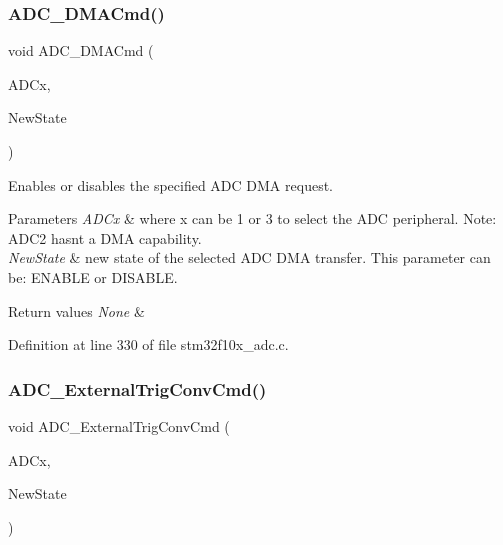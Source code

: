 \subsubsection{\texorpdfstring{A\+D\+C\+\_\+\+D\+M\+A\+Cmd()}{ADC\_DMACmd()}}
{\footnotesize\ttfamily void A\+D\+C\+\_\+\+D\+M\+A\+Cmd (\begin{DoxyParamCaption}\item[{\hyperlink{struct_a_d_c___type_def}{A\+D\+C\+\_\+\+Type\+Def} $\ast$}]{A\+D\+Cx,  }\item[{\hyperlink{group___exported__types_gac9a7e9a35d2513ec15c3b537aaa4fba1}{Functional\+State}}]{New\+State }\end{DoxyParamCaption})}



Enables or disables the specified A\+DC D\+MA request. 


\begin{DoxyParams}{Parameters}
{\em A\+D\+Cx} & where x can be 1 or 3 to select the A\+DC peripheral. Note\+: A\+D\+C2 hasn\textquotesingle{}t a D\+MA capability. \\
\hline
{\em New\+State} & new state of the selected A\+DC D\+MA transfer. This parameter can be\+: E\+N\+A\+B\+LE or D\+I\+S\+A\+B\+LE. \\
\hline
\end{DoxyParams}

\begin{DoxyRetVals}{Return values}
{\em None} & \\
\hline
\end{DoxyRetVals}


Definition at line 330 of file stm32f10x\+\_\+adc.\+c.

\mbox{\label{group___a_d_c___exported___functions_ga3ae92d7940a16c898223374a5857f509}} 
\subsubsection{\texorpdfstring{A\+D\+C\+\_\+\+External\+Trig\+Conv\+Cmd()}{ADC\_ExternalTrigConvCmd()}}
{\footnotesize\ttfamily void A\+D\+C\+\_\+\+External\+Trig\+Conv\+Cmd (\begin{DoxyParamCaption}\item[{\hyperlink{struct_a_d_c___type_def}{A\+D\+C\+\_\+\+Type\+Def} $\ast$}]{A\+D\+Cx,  }\item[{\hyperlink{group___exported__types_gac9a7e9a35d2513ec15c3b537aaa4fba1}{Functional\+State}}]{New\+State }\end{DoxyParamCaption})}



